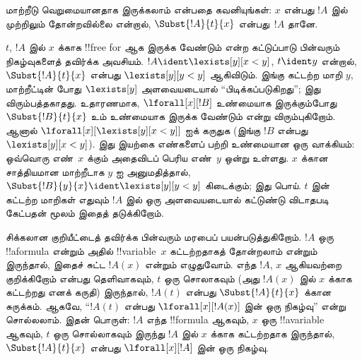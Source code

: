 \documentclass[../../../include/open-logic-section]{subfiles}
\begin{document}
\begin{explain}
மாற்றீடு வெறுமையானதாக இருக்கலாம் என்பதை கவனியுங்கள்: $x$ என்பது $!A$ இல்
முற்றிலும் தோன்றவில்லை என்றால், $\Subst{!A}{t}{x}$ என்பது~$!A$ தானே.

$t$, $!A$ இல் $x$ க்காக !!{free for} ஆக இருக்க வேண்டும் என்ற கட்டுப்பாடு
பின்வரும் நிகழ்வுகளைத் தவிர்க்க அவசியம். $!A \ident \lexists[y][x < y]$,
$t \ident y$ என்றால், $\Subst{!A}{t}{x}$ என்பது $\lexists[y][y <
  y]$ ஆகிவிடும். இங்கு கட்டற்ற மாறி $y$, மாற்றீட்டின் போது
$\lexists[y]$ அளவையடையால் ``பிடிக்கப்படுகிறது''; இது விரும்பத்தகாதது.
உதாரணமாக, $\lforall[x][!B]$ உண்மையாக இருக்கும்போது
$\Subst{!B}{t}{x}$ உம் உண்மையாக இருக்க வேண்டும் என்று விரும்புகிறோம்.
ஆனால் $\lforall[x][\lexists[y][x < y]]$ ஐக் கருதுக (இங்கு $!B$ என்பது
$\lexists[y][x < y]$). இது இயற்கை எண்களைப் பற்றி உண்மையான ஒரு வாக்கியம்:
ஒவ்வொரு எண்~$x$ க்கும் அதைவிடப் பெரிய எண்~$y$ ஒன்று உள்ளது. $x$ க்கான
சாத்தியமான மாற்றீடாக $y$ ஐ அனுமதித்தால்,
$\Subst{!B}{y}{x} \ident \lexists[y][y < y]$ கிடைக்கும்; இது பொய்.
$t$ இன் கட்டற்ற மாறிகள் எதுவும் $!A$ இல் ஒரு அளவையடையால் கட்டுண்டு
விடாதபடி கேட்பதன் மூலம் இதைத் தடுக்கிறோம்.
\end{explain}

சிக்கலான குறியீட்டைத் தவிர்க்க பின்வரும் மரபைப் பயன்படுத்துகிறோம். $!A$ ஒரு
!!a{formula} என்றும் அதில் !!{variable}~$x$ கட்டற்றதாகத் தோன்றலாம் என்றும்
இருந்தால், இதைச் சுட்ட $!A(x)$ என்றும் எழுதுவோம். எந்த $!A$, $x$ ஆகியவற்றை
குறிக்கிறோம் என்பது தெளிவாகவும், $t$ ஒரு சொலாகவும் (அது $!A(x)$ இல் $x$
க்காக கட்டற்றது எனக் கருதி) இருந்தால், $!A(t)$ என்பது
$\Subst{!A}{t}{x}$ க்கான சுருக்கம். ஆகவே, ``$!A(t)$ என்பது
$\lforall[x][!A(x)]$ இன் ஒரு நிகழ்வு'' என்று சொல்லலாம். இதன் பொருள்:
$!A$ எந்த !!{formula} ஆகவும், $x$ ஒரு !!a{variable} ஆகவும், $t$ ஒரு
சொல்லாகவும் இருந்து $!A$ இல் $x$ க்காக கட்டற்றதாக இருந்தால்,
$\Subst{!A}{t}{x}$ என்பது $\lforall[x][!A]$ இன் ஒரு நிகழ்வு.
\end{document}
